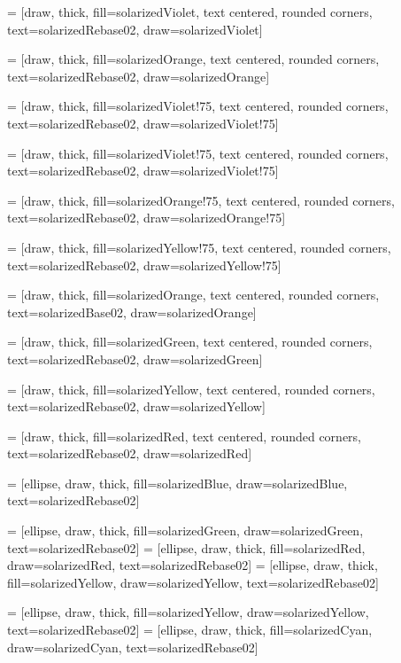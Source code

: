  = [draw, thick, fill=solarizedViolet, text centered, rounded corners,
    text=solarizedRebase02, draw=solarizedViolet]

 = [draw, thick, fill=solarizedOrange, text centered, rounded corners,
    text=solarizedRebase02, draw=solarizedOrange]

 = [draw, thick, fill=solarizedViolet!75, text centered, rounded corners,
    text=solarizedRebase02, draw=solarizedViolet!75]

 = [draw, thick, fill=solarizedViolet!75, text centered, rounded corners,
    text=solarizedRebase02, draw=solarizedViolet!75]

 = [draw, thick, fill=solarizedOrange!75, text centered, rounded corners,
    text=solarizedRebase02, draw=solarizedOrange!75]

 = [draw, thick, fill=solarizedYellow!75, text centered, rounded corners,
    text=solarizedRebase02, draw=solarizedYellow!75]

 = [draw, thick, fill=solarizedOrange, text centered, rounded corners,
text=solarizedBase02, draw=solarizedOrange]

 = [draw, thick, fill=solarizedGreen, text centered, rounded corners,
    text=solarizedRebase02, draw=solarizedGreen]

 = [draw, thick, fill=solarizedYellow, text centered, rounded corners,
    text=solarizedRebase02, draw=solarizedYellow]

 = [draw, thick, fill=solarizedRed, text centered, rounded corners,
    text=solarizedRebase02, draw=solarizedRed]

 = [ellipse, draw, thick, fill=solarizedBlue, draw=solarizedBlue, text=solarizedRebase02]

 = [ellipse, draw, thick, fill=solarizedGreen, draw=solarizedGreen, text=solarizedRebase02]
 = [ellipse, draw, thick, fill=solarizedRed, draw=solarizedRed, text=solarizedRebase02]
 = [ellipse, draw, thick, fill=solarizedYellow, draw=solarizedYellow,
    text=solarizedRebase02]

 = [ellipse, draw, thick, fill=solarizedYellow, draw=solarizedYellow,
    text=solarizedRebase02]
 = [ellipse, draw, thick, fill=solarizedCyan, draw=solarizedCyan, text=solarizedRebase02]

